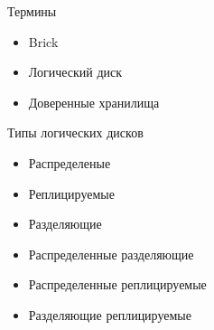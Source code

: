 \documentclass[sans]{beamer}
\begin{document}
\begin{frame}{Термины}
	\begin{itemize}

		\item Brick           %
		\item Логический диск %



		\item Доверенные хранилища
	\end{itemize}
\end{frame}

\begin{frame}{Типы логических дисков}
	\begin{itemize}
		\item Распределеные
		\item Реплицируемые
		\item Разделяющие
		\vspace{1cm}
		\item Распределенные разделяющие
		\item Распределенные реплицируемые
		\item Разделяющие реплицируемые
	\end{itemize}
\end{frame}
\end{document}
